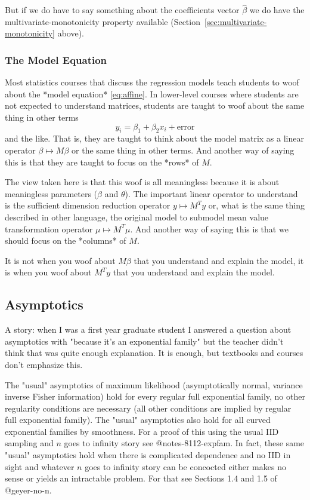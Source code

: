 \documentclass[11pt]{article}
\begin{document}
But if we do have to say something about the coefficients vector $\hat{\beta}$
we do have the multivariate-monotonicity property available
(Section~\ref{sec:multivariate-monotonicity} above).

\subsubsection{The Model Equation}

Most statistics courses that discuss the regression models teach students
to woof about the *model equation* \eqref{eq:affine}.
In lower-level courses where students are not expected to understand matrices,
students are taught to woof about the same thing in other terms
$$
   y_i = \beta_1 + \beta_2 x_i + \text{error}
$$
and the like.  That is, they are taught to think about the model matrix
as a linear operator $\beta \mapsto M \beta$ or the same thing in other
terms.  And another way of saying this is that they are taught to focus
on the *rows* of $M$.

The view taken here is that this woof is all meaningless because it is
about meaningless parameters ($\beta$ and $\theta$).  The important
linear operator to understand is the sufficient dimension reduction operator
$y \mapsto M^T y$ or, what is the same thing described in other language,
the original model to submodel mean value transformation operator
$\mu \mapsto M^T \mu$.
And another way of saying this is that we should focus
on the *columns* of $M$.

It is not when you woof about $M \beta$ that you understand and explain the
model, it is when you woof about $M^T y$ that you understand and explain the
model.

\subsection{Asymptotics}

A story: when I was a first year graduate student I answered a question
about asymptotics with "because it's an exponential family" but the teacher
didn't think that was quite enough explanation.  It is enough, but
textbooks and courses don't emphasize this.

The "usual" asymptotics of
maximum likelihood (asymptotically normal, variance inverse Fisher information)
hold for every regular full exponential family, no other regularity conditions
are necessary (all other conditions are implied by regular full exponential
family).  The "usual" asymptotics also hold for all curved exponential families
by smoothness.  For a proof of this using the usual IID sampling
and $n$ goes to infinity story see @notes-8112-expfam.
In fact, these same "usual" asymptotics hold when there is complicated
dependence and no IID in sight and whatever $n$ goes to infinity story
can be concocted either makes no sense or yields an intractable problem.
For that see Sections 1.4 and 1.5 of @geyer-no-n.
\end{document}
